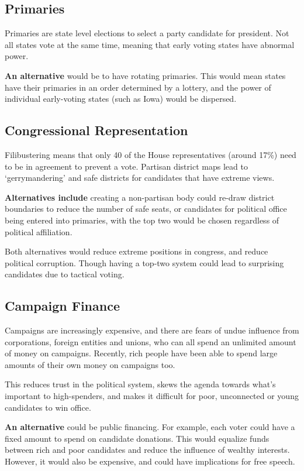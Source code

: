 \subsection{Primaries}

Primaries are state level elections to select a party candidate for
president. Not all states vote at the same time, meaning that early
voting states have abnormal power.

\textbf{An alternative} would be to have rotating primaries. This
would mean states have their primaries in an order determined by a
lottery, and the power of individual early-voting states (such as
Iowa) would be dispersed.

\subsection{Congressional Representation}

Filibustering means that only 40 of the House representatives (around
17\%) need to be in agreement to prevent a vote. Partisan district
maps lead to `gerrymandering' and safe districts for candidates that
have extreme views.

\textbf{Alternatives include} creating a non-partisan body could
re-draw district boundaries to reduce the number of safe seats, or
candidates for political office being entered into primaries, with the
top two would be chosen regardless of political affiliation.

Both alternatives would reduce extreme positions in congress, and
reduce political corruption. Though having a top-two system could lead
to surprising candidates due to tactical voting.

\subsection{Campaign Finance}

Campaigns are increasingly expensive, and there are fears of undue
influence from corporations, foreign entities and unions, who can all
spend an unlimited amount of money on campaigns. Recently, rich people
have been able to spend large amounts of their own money on campaigns
too.

This reduces trust in the political system, skews the agenda towards
what's important to high-spenders, and makes it difficult for poor,
unconnected or young candidates to win office.

\textbf{An alternative} could be public financing. For example, each
voter could have a fixed amount to spend on candidate donations. This
would equalize funds between rich and poor candidates and reduce the
influence of wealthy interests. However, it would also be expensive,
and could have implications for free speech.

